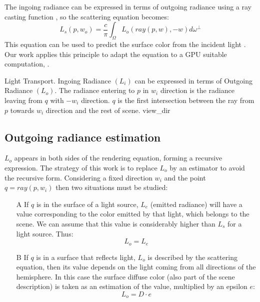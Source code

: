 \documentclass[10pt, conference]{IEEEtran}
\begin{document}
The ingoing radiance can be expressed in terms of outgoing radiance using a ray casting function \cite{ray_casting_function}, so the scattering equation becomes:
\[
	L_s(p,w_o) = \frac{c}{\pi }\int_ \Omega L_o(ray(p,w), -w)d\omega^\perp
\]
This equation can be used to predict the surface color from the incident light \cite{scattering_equation}. 
Our work applies this principle to adapt the equation to a GPU suitable computation, .

\subimages
	{Light Transport. Ingoing Radiance $(L_i)$ can be expressed in terms of Outgoing Radiance $(L_o)$.
		The radiance entering to $p$ in $w_i$ direction is the radiance leaving from $q$ with $-w_i$ direction. 
		$q$ is the first intersection between the ray from $p$ towards $w_i$ direction and the rest of scene.}
	{view_dir}{
}

\subsection{Outgoing radiance estimation}
%
$L_o$ appears in both sides of the rendering equation, forming a recursive expression. The strategy of this work is to replace $L_o$ by an estimator to avoid the recursive form. 
Considering a fixed direction $w_i$ and the point $q = ray(p, w_i)$ then two situations must be studied:

\begin{itemize}
	\item[A] If $q$ is in the surface of a light source, $L_e$ (emitted radiance) will have a value corresponding to the color emitted by that light, which belongs to the scene. We can assume that this value is considerably higher than $L_s$ for a light source. Thus:
		\begin{equation}
			\label{eq_radiance_case_A}
			L_o = L_e 
		\end{equation}
	\item[B] If $q$ is in a surface that reflects light, $L_o$ is described by the scattering equation, then its value depends on the light coming from all directions of the hemisphere. In this case the surface diffuse color (also part of the scene description) is taken as an estimation of the value, multiplied by an epsilon $e$:
		\begin{equation}
			\label{eq_radiance_case_B}
			L_o = D \cdotp e 
		\end{equation}
\end{itemize}
\end{document}
